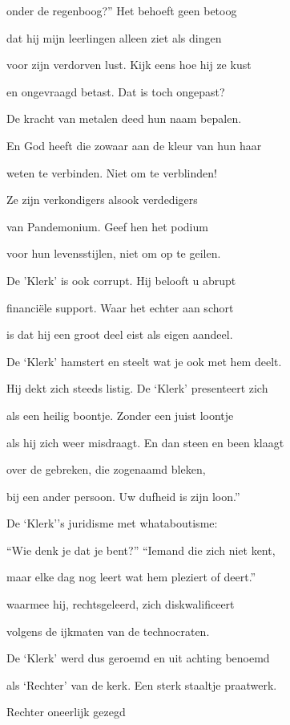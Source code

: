 onder de regenboog?”
Het behoeft geen betoog

dat hij mijn leerlingen
alleen ziet als dingen

voor zijn verdorven lust.
Kijk eens hoe hij ze kust

en ongevraagd betast.
Dat is toch ongepast?

De kracht van metalen
deed hun naam bepalen.

En God heeft die zowaar
aan de kleur van hun haar

weten te verbinden.
Niet om te verblinden!

Ze zijn verkondigers
alsook verdedigers

van Pandemonium.
Geef hen het podium

voor hun levensstijlen,
niet om op te geilen.

De 'Klerk' is ook corrupt.
Hij belooft u abrupt

financiële support.
Waar het echter aan schort

is dat hij een groot deel
eist als eigen aandeel.

De ‘Klerk’ hamstert en steelt
wat je ook met hem deelt.

Hij dekt zich steeds listig.
De ‘Klerk’ presenteert zich

als een heilig boontje.
Zonder een juist loontje

als hij zich weer misdraagt.
En dan steen en been klaagt

over de gebreken,
die zogenaamd bleken,

bij een ander persoon.
Uw dufheid is zijn loon.”

De ‘Klerk’’s juridisme
met whataboutisme:

“Wie denk je dat je bent?”
“Iemand die zich niet kent,

maar elke dag nog leert
wat hem pleziert of deert.”

waarmee hij, rechtsgeleerd, zich diskwalificeert

volgens de ijkmaten
van de technocraten.

De ‘Klerk’ werd dus geroemd
en uit achting benoemd

als ‘Rechter’ van de kerk.
Een sterk staaltje praatwerk.

Rechter oneerlijk gezegd
